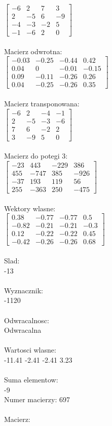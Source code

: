 \documentclass[a4paper,12pt]{article}
\begin{document}
$\begin{bmatrix} -6&2&7&3\\2&-5&6&-9\\-4&-3&-2&5\\-1&-6&2&0 \end{bmatrix}$
\\
\\
Macierz odwrotna:\\

$\begin{bmatrix} -0.03&-0.25&-0.44&0.42\\0.04&0&-0.01&-0.15\\0.09&-0.11&-0.26&0.26\\0.04&-0.25&-0.26&0.35 \end{bmatrix}$
\\
\\
Macierz transponowana:\\

$\begin{bmatrix} -6&2&-4&-1\\2&-5&-3&-6\\7&6&-2&2\\3&-9&5&0 \end{bmatrix}$
\\
\\
Macierz do potegi 3:\\

$\begin{bmatrix} -23&443&-229&386\\455&-747&385&-926\\-37&193&119&56\\255&-363&250&-475 \end{bmatrix}$
\\
\\
Wektory wlasne:\\

$\begin{bmatrix} 0.38&-0.77&-0.77&0.5\\-0.82&-0.21&-0.21&-0.3\\0.12&-0.22&-0.22&0.45\\-0.42&-0.26&-0.26&0.68 \end{bmatrix}$
\\
\\
Slad:\\
-13
\\
\\
Wyznacznik:\\
-1120
\\
\\
Odwracalnosc:\\
Odwracalna
\\
\\
Wartosci wlasne:\\
-11.41 -2.41 -2.41 3.23
\\
\\
Suma elementow:\\
-9
\\
\newpage
Numer macierzy:
697
\\
\\
Macierz:\\
\end{document}
